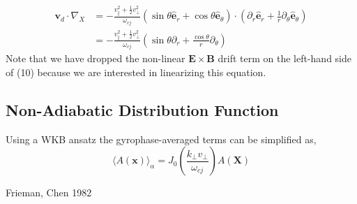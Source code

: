 \documentclass[12pt]{article}
\begin{document}
   \begin{equation}
   \begin{aligned}
      \bm{v}_d\cdot\nabla_X &= -\frac{v_\parallel^2 + \frac{1}{2}v_\perp^2}{\omega_{cj}}(\sin\theta\bm{\hat{e}}_r + \cos\theta\bm{\hat{e}}_\theta)
                              \cdot(\partial_r\bm{\hat{e}}_r + \frac{1}{r}\partial_\theta\bm{\hat{e}}_\theta) \\
                            &= -\frac{v_\parallel^2 + \frac{1}{2}v_\perp^2}{\omega_{cj}}(\sin\theta\partial_r + \frac{\cos\theta}{r}\partial_\theta)
   \end{aligned}
   \end{equation}
Note that we have dropped the non-linear $\bm{E}\times\bm{B}$ drift term on the left-hand side of (10) because we are
interested in linearizing this equation.

\subsection{Non-Adiabatic Distribution Function}
   \quad Using a WKB ansatz the gyrophase-averaged terms can be simplified as,
   \begin{equation}
      \langle A(\bm{x})\rangle_\alpha = J_0(\frac{k_\perp v_\perp}{\omega_{cj}}) A(\bm{X})
   \end{equation}

\begin{thebibliography}{0}
	
	 Frieman, Chen 1982
	
\end{thebibliography}
    
\end{document}
